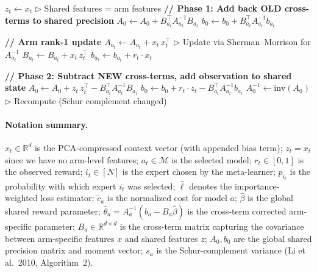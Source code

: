 \begin{algorithm}[h]
\begin{algorithmic}[1]
\medskip
{}
    \STATE $z_t \leftarrow x_t$ \hfill $\triangleright$ Shared features = arm features
    \medskip
    \STATE \textbf{// Phase 1: Add back OLD cross-terms to shared precision}
    \STATE $A_0 \leftarrow A_0 + B_{a_t}^\top A_{a_t}^{-1} B_{a_t}$
    \STATE $b_0 \leftarrow b_0 + B_{a_t}^\top A_{a_t}^{-1} b_{a_t}$
    
    \medskip
    \STATE \textbf{// Arm rank-1 update}
    \STATE $A_{a_t} \leftarrow A_{a_t} + x_t\, x_t^\top$ \hfill $\triangleright$ Update via Sherman--Morrison for $A_{a_t}^{-1}$
    \STATE $B_{a_t} \leftarrow B_{a_t} + x_t\, z_t^\top$
    \STATE $b_{a_t} \leftarrow b_{a_t} + r_t \cdot x_t$
    
    \medskip
    \STATE \textbf{// Phase 2: Subtract NEW cross-terms, add observation to shared state}
    \STATE $A_0 \leftarrow A_0 + z_t\, z_t^\top - B_{a_t}^\top A_{a_t}^{-1} B_{a_t}$
    \STATE $b_0 \leftarrow b_0 + r_t \cdot z_t - B_{a_t}^\top A_{a_t}^{-1} b_{a_t}$
    \STATE $A_0^{-1} \leftarrow \text{inv}(A_0)$ \hfill $\triangleright$ Recompute (Schur complement changed)
\ENDFUNCTION

\end{algorithmic}
\end{algorithm}

\paragraph{Notation summary.}
$x_t \in \mathbb{R}^{d}$ is the PCA-compressed context vector (with appended bias term);
$z_t = x_t$ since we have no arm-level features;
$a_t \in \mathcal{M}$ is the selected model;
$r_t \in [0, 1]$ is the observed reward;
$i_t \in [N]$ is the expert chosen by the meta-learner;
$p_{i_t}$ is the probability with which expert $i_t$ was selected;
$\hat{\ell}$ denotes the importance-weighted loss estimator;
$\tilde{c}_a$ is the normalized cost for model $a$;
$\hat{\beta}$ is the global shared reward parameter;
$\hat{\theta}_a = A_a^{-1}(b_a - B_a \hat{\beta})$ is the cross-term corrected
arm-specific parameter;
$B_a \in \mathbb{R}^{d \times d}$ is the cross-term matrix capturing the covariance
between arm-specific features $x$ and shared features $z$;
$A_0, b_0$ are the global shared precision matrix and moment vector;
$s_a$ is the Schur-complement variance (Li et al.\ 2010, Algorithm~2).

